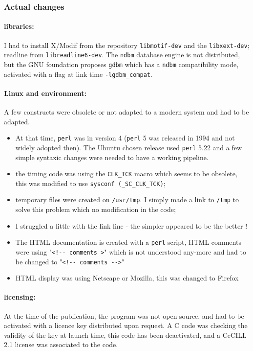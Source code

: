 \hypertarget{actual-changes}{%
\subsubsection{Actual changes}\label{actual-changes}}

\paragraph{libraries:} I had to install X/Modif from the repository
\texttt{libmotif-dev} and the \texttt{libxext-dev}; readline from
\texttt{libreadline6-dev}. The \texttt{ndbm} database engine is not
distributed, but the GNU foundation proposes \texttt{gdbm} which has a
\texttt{ndbm} compatibility mode, activated with a flag at link time
\texttt{-lgdbm\_compat}.

\paragraph{Linux and environment:} A few constructs were obsolete or not
adapted to a modern system and had to be adapted.

\begin{itemize}
\tightlist
\item
  At that time, \texttt{perl} was in version 4 (\texttt{perl} 5 was
  released in 1994 and not widely adopted then). The Ubuntu chosen
  release used \texttt{perl} 5.22 and a few simple syntaxic changes were
  needed to have a working pipeline.
\item
  the timing code was using the \texttt{CLK\_TCK} macro which seems to
  be obsolete, this was modified to use
  \texttt{sysconf\ (\_SC\_CLK\_TCK)};
\item
  temporary files were created on \texttt{/usr/tmp}. I simply made a
  link to \texttt{/tmp} to solve this problem which no modification in
  the code;
\item
  I struggled a little with the link line - the simpler appeared to be
  the better !
\item
  The HTML documentation is created with a \texttt{perl} script, HTML
  comments were using
  "\texttt{\textless{}!-\/-\ comments\ \textgreater{}}" which is not
  understood any-more and had to be changed to
  "\texttt{\textless{}!-\/-\ comments\ -\/-\textgreater{}}"
\item
  HTML display was using Netscape or Mozilla, this was changed to
  Firefox 
\end{itemize}

\paragraph{licensing:} At the time of the publication, the program was not
open-source, and had to be activated with a licence key distributed upon
request. A C code was checking the validity of the key at launch time,
this code has been deactivated, and a CeCILL 2.1 license \cite{CeCILL} was associated
to the code.

